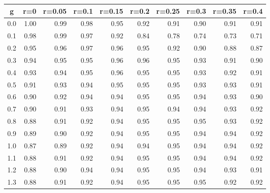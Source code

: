 %
\begin{table}[!tbp]
 \begin{center}
 \begin{tabular}{rrrrrrrrrr}\hline\hline
\multicolumn{1}{c}{g}&\multicolumn{1}{c}{r=0}&\multicolumn{1}{c}{r=0.05}&\multicolumn{1}{c}{r=0.1}&\multicolumn{1}{c}{r=0.15}&\multicolumn{1}{c}{r=0.2}&\multicolumn{1}{c}{r=0.25}&\multicolumn{1}{c}{r=0.3}&\multicolumn{1}{c}{r=0.35}&\multicolumn{1}{c}{r=0.4}\tabularnewline
\hline
0.0&1.00&0.99&0.98&0.95&0.92&0.91&0.90&0.91&0.91\tabularnewline
0.1&0.98&0.99&0.97&0.92&0.84&0.78&0.74&0.73&0.71\tabularnewline
0.2&0.95&0.96&0.97&0.96&0.95&0.92&0.90&0.88&0.87\tabularnewline
0.3&0.94&0.95&0.95&0.96&0.96&0.95&0.93&0.91&0.90\tabularnewline
0.4&0.93&0.94&0.95&0.96&0.95&0.95&0.93&0.92&0.91\tabularnewline
0.5&0.91&0.93&0.94&0.95&0.95&0.95&0.93&0.93&0.91\tabularnewline
0.6&0.90&0.92&0.94&0.94&0.95&0.95&0.94&0.93&0.90\tabularnewline
0.7&0.90&0.91&0.93&0.94&0.95&0.94&0.94&0.93&0.92\tabularnewline
0.8&0.88&0.91&0.92&0.94&0.95&0.95&0.95&0.93&0.92\tabularnewline
0.9&0.89&0.90&0.92&0.94&0.95&0.95&0.94&0.94&0.92\tabularnewline
1.0&0.87&0.89&0.92&0.94&0.94&0.95&0.94&0.94&0.92\tabularnewline
1.1&0.88&0.91&0.92&0.94&0.95&0.95&0.94&0.94&0.92\tabularnewline
1.2&0.88&0.90&0.94&0.94&0.95&0.95&0.94&0.93&0.91\tabularnewline
1.3&0.88&0.91&0.92&0.94&0.95&0.95&0.95&0.92&0.92\tabularnewline
\hline
\end{tabular}

\end{center}

\end{table}

